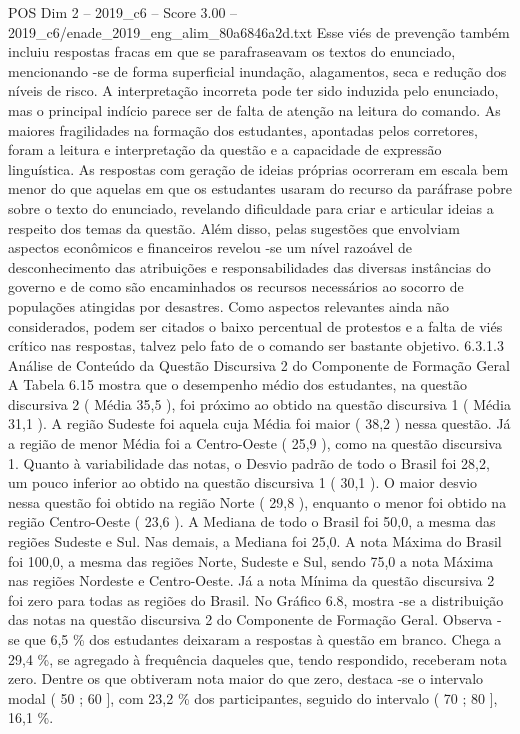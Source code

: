 \begin{textsample}{POS Dim 2 – 2019\_c6 – Score 3.00 – 2019\_c6/enade\_2019\_eng\_alim\_80a6846a2d.txt}
Esse viés de prevenção também incluiu respostas fracas em que se parafraseavam os textos do enunciado, mencionando -se de forma superficial inundação, alagamentos, seca e redução dos níveis de risco.
A interpretação incorreta pode ter sido induzida pelo enunciado, mas o principal indício parece ser de falta de atenção na leitura do comando.
As maiores fragilidades na formação dos estudantes, apontadas pelos corretores, foram a leitura e interpretação da questão e a capacidade de expressão linguística.
As respostas com geração de ideias próprias ocorreram em escala bem menor do que aquelas em que os estudantes usaram do recurso da paráfrase pobre sobre o texto do enunciado, revelando dificuldade para criar e articular ideias a respeito dos temas da questão.
Além disso, pelas sugestões que envolviam aspectos econômicos e financeiros revelou -se um nível razoável de desconhecimento das atribuições e responsabilidades das diversas instâncias do governo e de como são encaminhados os recursos necessários ao socorro de populações atingidas por desastres.
Como aspectos relevantes ainda não considerados, podem ser citados o baixo percentual de protestos e a falta de viés crítico nas respostas, talvez pelo fato de o comando ser bastante objetivo. 6.3.1.3 Análise de Conteúdo da Questão Discursiva 2 do Componente de Formação Geral A Tabela 6.15 mostra que o desempenho médio dos estudantes, na questão discursiva 2 ( Média 35,5 ), foi próximo ao obtido na questão discursiva 1 ( Média 31,1 ).
A região Sudeste foi aquela cuja Média foi maior ( 38,2 ) nessa questão.
Já a região de menor Média foi a Centro-Oeste ( 25,9 ), como na questão discursiva 1.
Quanto à variabilidade das notas, o Desvio padrão de todo o Brasil foi 28,2, um pouco inferior ao obtido na questão discursiva 1 ( 30,1 ).
O maior desvio nessa questão foi obtido na região Norte ( 29,8 ), enquanto o menor foi obtido na região Centro-Oeste ( 23,6 ).
A Mediana de todo o Brasil foi 50,0, a mesma das regiões Sudeste e Sul.
Nas demais, a Mediana foi 25,0.
A nota Máxima do Brasil foi 100,0, a mesma das regiões Norte, Sudeste e Sul, sendo 75,0 a nota Máxima nas regiões Nordeste e Centro-Oeste.
Já a nota Mínima da questão discursiva 2 foi zero para todas as regiões do Brasil.
No Gráfico 6.8, mostra -se a distribuição das notas na questão discursiva 2 do Componente de Formação Geral.
Observa -se que 6,5 \% dos estudantes deixaram a respostas à questão em branco.
Chega a 29,4 \%, se agregado à frequência daqueles que, tendo respondido, receberam nota zero.
Dentre os que obtiveram nota maior do que zero, destaca -se o intervalo modal ( 50 ; 60 ], com 23,2 \% dos participantes, seguido do intervalo ( 70 ; 80 ], 16,1 \%.

\end{textsample}
